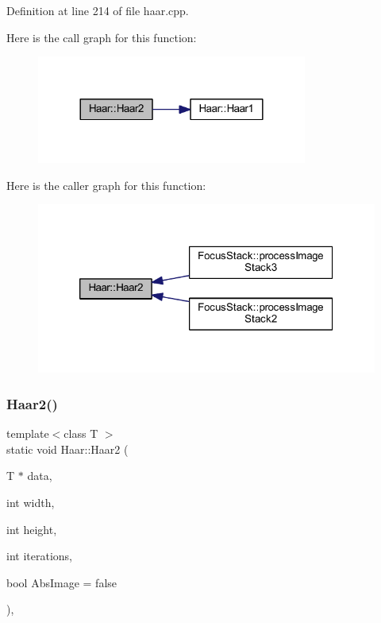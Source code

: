 Definition at line 214 of file haar.\+cpp.

Here is the call graph for this function\+:
\nopagebreak
\begin{figure}[H]
\begin{center}
\leavevmode
\includegraphics[width=252pt]{class_haar_afde8fa7a1d65b505185a29fc7eaf4b2d_cgraph}
\end{center}
\end{figure}
Here is the caller graph for this function\+:
\nopagebreak
\begin{figure}[H]
\begin{center}
\leavevmode
\includegraphics[width=320pt]{class_haar_afde8fa7a1d65b505185a29fc7eaf4b2d_icgraph}
\end{center}
\end{figure}
\mbox{\label{class_haar_a4b2951fd5ec6f760fc94bd4273e2c544}} 
\subsubsection{\texorpdfstring{Haar2()}{Haar2()}\hspace{0.1cm}{\footnotesize\ttfamily [2/2]}}
{\footnotesize\ttfamily template$<$class T $>$ \\
static void Haar\+::\+Haar2 (\begin{DoxyParamCaption}\item[{T $\ast$}]{data,  }\item[{int}]{width,  }\item[{int}]{height,  }\item[{int}]{iterations,  }\item[{bool}]{Abs\+Image = {\ttfamily false} }\end{DoxyParamCaption})\hspace{0.3cm}{\ttfamily [inline]}, {\ttfamily [static]}}

